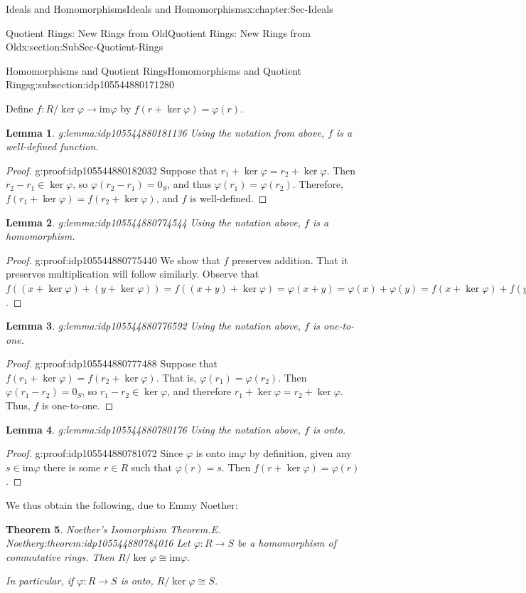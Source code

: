 \documentclass[oneside,10pt,]{book}
\numberwithin{equation}{section}
\def\p{\varphi}
\def\im{\text{im}}
\newtheorem{theorem}{Theorem}[section]
\newtheorem{lemma}[theorem]{Lemma}
\begin{document}
\begin{chapterptx}{Ideals and Homomorphisms}{}{Ideals and Homomorphisms}{}{}{x:chapter:Sec-Ideals}
\begin{sectionptx}{Quotient Rings: New Rings from Old}{}{Quotient Rings: New Rings from Old}{}{}{x:section:SubSec-Quotient-Rings}
\begin{subsectionptx}{Homomorphisms and Quotient Rings}{}{Homomorphisms and Quotient Rings}{}{}{g:subsection:idp105544880171280}
\par
Define \(f: R/\ker \p \to \im \p\) by \(f(r+\ker \p) = \p(r)\).%
\begin{lemma}{}{}{g:lemma:idp105544880181136}%
Using the notation from above, \(f\) is a well-defined function.%
\end{lemma}
\begin{proof}{}{g:proof:idp105544880182032}
Suppose that \(r_1 + \ker\p = r_2 + \ker\p\). Then \(r_2-r_1 \in \ker\p\), so \(\p(r_2-r_1) = 0_S\), and thus \(\p(r_1) = \p(r_2)\). Therefore, \(f(r_1+\ker\p) = f(r_2+\ker\p)\), and \(f\) is well-defined.%
\end{proof}
\begin{lemma}{}{}{g:lemma:idp105544880774544}%
Using the notation above, \(f\) is a homomorphism.%
\end{lemma}
\begin{proof}{}{g:proof:idp105544880775440}
We show that \(f\) preserves addition. That it preserves multiplication will follow similarly. Observe that \(f((x+\ker\p) + (y+\ker\p)) = f((x+y)+\ker\p) = \p(x+y) = \p(x)+\p(y) = f(x+\ker\p) + f(y+\ker\p)\).%
\end{proof}
\begin{lemma}{}{}{g:lemma:idp105544880776592}%
Using the notation above, \(f\) is one-to-one.%
\end{lemma}
\begin{proof}{}{g:proof:idp105544880777488}
Suppose that \(f(r_1 + \ker\p) = f(r_2 + \ker\p)\). That is, \(\p(r_1) = \p(r_2)\). Then \(\p(r_1 - r_2) = 0_S\), so \(r_1 -r_2 \in \ker\p\), and therefore \(r_1 + \ker\p = r_2 + \ker \p\). Thus, \(f\) is one-to-one.%
\end{proof}
\begin{lemma}{}{}{g:lemma:idp105544880780176}%
Using the notation above, \(f\) is onto.%
\end{lemma}
\begin{proof}{}{g:proof:idp105544880781072}
Since \(\p\) is onto \(\im \p\) by definition, given any \(s\in \im \p\) there is some \(r\in R\) such that \(\p(r) = s\). Then \(f(r+\ker\p) = \p(r)\).%
\end{proof}
We thus obtain the following, due to Emmy Noether:%
\begin{theorem}{Noether's Isomorphism Theorem.}{E. Noether}{g:theorem:idp105544880784016}%
%
Let \(\p : R\to S\) be a homomorphism of commutative rings. Then \(R/\ker \p \cong \im \p\).%
\par
In particular, if \(\p : R\to S\) is onto, \(R/\ker \p \cong S\).%

\end{theorem}
\end{subsectionptx}
\end{sectionptx}
\end{chapterptx}
\end{document}
